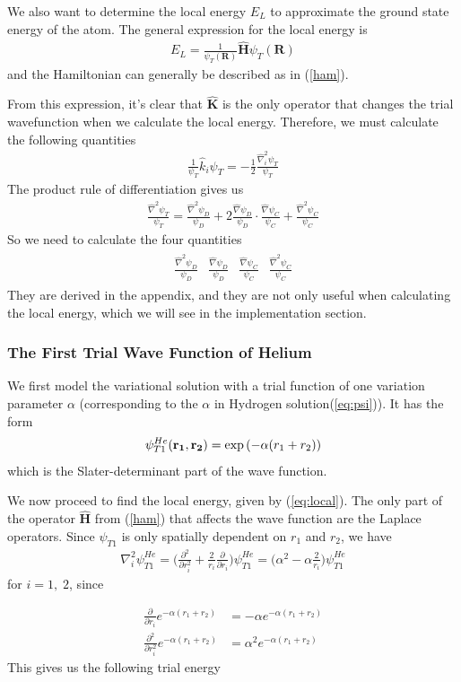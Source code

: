 \documentclass[twocolumns, a4paper,10pt,fleqn]{extarticle}
\newcommand{\eq}[1]{{\small\begin{align*}#1\end{align*}}}
\newcommand{\mat}[1]{\begin{matrix}#1\end{matrix}}
\renewcommand\vec[1]{\boldsymbol{\mathbf{#1}}}
\newcommand{\OP}[1]{\mathbf{\widehat{#1}}}
\newcommand{\op}[1]{\hat{#1}}
\begin{document}
We also want to determine the local energy $E_L$ to approximate
the ground state energy of the atom.
The general expression for the local energy is
\eq{
  E_L = \frac{1}{\psi_T (\vec R)}\OP H \psi_T (\vec R) 
}
and the Hamiltonian can generally be described as in (\ref{ham}).

From this expression, it's clear that $\OP K$ is the only operator that changes the
trial wavefunction when we calculate the local energy. Therefore, we must calculate the
following quantities
\eq{
  \frac{1}{\psi_T}\op k_i \psi_T = -\frac{1}{2}\frac{\op\nabla_i^2 \psi_T}{\psi_T}
}
The product rule of differentiation gives us
\eq{
  \frac{\op\nabla^2 \psi_T}{\psi_T} = 
  \frac{\op\nabla^2 \psi_D}{\psi_D}
    +2 \frac{\op\nabla \psi_D}{\psi_D}\cdot\frac{\op\nabla \psi_C}{\psi_C}
    +\frac{\op\nabla^2 \psi_C}{\psi_C}
}
So we need to calculate the four quantities
\eq{\mat{
  \frac{\op\nabla^2 \psi_D}{\psi_D}&
    \frac{\op\nabla \psi_D}{\psi_D}&
    \frac{\op\nabla \psi_C}{\psi_C}&
    \frac{\op\nabla^2 \psi_C}{\psi_C}
}}
They are derived in the appendix, and they are not only useful when calculating the
local energy, which we will see in the implementation section.

\subsubsection{The First Trial Wave Function of Helium}
We first model the variational solution with a trial function of one
variation parameter $\alpha$ 
(corresponding to the $\alpha$ in Hydrogen solution(\ref{eq:psi})).
It has the form
\eq{
\psi_{T1}^{He}({\bf r_1},{\bf r_2}) = 
   \exp{\left(-\alpha(r_1+r_2)\right)}
}
which is the Slater-determinant part of the wave function.

We now proceed to find the local energy, given by (\ref{eq:local}).
The only part of the operator $\OP H$ from (\ref{ham}) that affects the wave function
are the Laplace operators.
Since $\psi_{T1}$ is only spatially dependent on $r_1$ and $r_2$, we have
\eq{
  \nabla_i^2 \psi_{T1}^{He} = \bigg( \frac{\partial^2}{\partial r_i^2} 
    + \frac{2}{r_i} \frac{\partial}{\partial r_i} \bigg) \psi_{T1}^{He}
    = \bigg( \alpha^2 -\alpha\frac{2}{r_i}  \bigg)\psi_{T1}^{He}
}
for $i = 1,\;2$, since

\eq{
  \frac{\partial}{\partial r_i} e^{-\alpha (r_1+r_2)}
    &= -\alpha e^{-\alpha (r_1+r_2)}\\
\frac{\partial^2}{\partial r_i^2} e^{-\alpha (r_1+r_2)}
    &= \alpha^2 e^{-\alpha (r_1+r_2)}
}
This gives us the following trial energy
\end{document}
